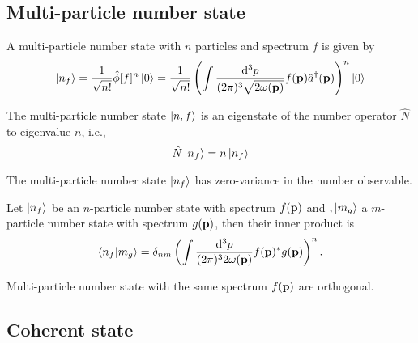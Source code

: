 \subsection{Multi-particle number state}

\begin{definition}
	A multi-particle number state with $n$ particles and spectrum $f$ is given by
	\begin{equation}
		\ket{n_f}
		=
		\frac{1}{\sqrt{n!}}
		\hat\phi[f]^n
		\ket{0}
		=
		\frac{1}{\sqrt{n!}}
		\left(
			\int\frac{\dd[3]{p}}{(2\pi)^3\sqrt{2\omega(\vb{p})}}
			f(\vb{p})
			\hat{a}^\dagger(\vb{p})
		\right)^n
		\ket{0}
	\end{equation}
\end{definition}
\begin{theorem}
	The multi-particle number state $\ket{n,f}$ is an eigenstate of the number operator $\hat{N}$ to eigenvalue $n$, i.e.,
	\begin{equation}
		\hat{N}
		\ket{n_f}
		=
		n
		\ket{n_f}
	\end{equation}
\end{theorem}
\begin{corollary}
	The multi-particle number state $\ket{n_f}$ has zero-variance in the number observable.
\end{corollary}
\begin{theorem}\label{thm:multi_particle_number_state_inner_product}
	Let $\ket{n_f}$ be an $n$-particle number state with spectrum $f(\vb{p})$ and $,\ket{m_g}$ a $m$-particle number state with spectrum $g(\vb{p})$, then their inner product is
	\begin{equation}
		\braket{n_f}{m_g}
		=
		\delta_{nm}
		\left(
			\int\frac{\dd[3]{p}}{(2\pi)^32\omega(\vb{p})}
			f(\vb{p})^*
			g(\vb{p})
		\right)^n
		.
	\end{equation}
\end{theorem}
\begin{corollary}
	Multi-particle number state with the same spectrum $f(\vb{p})$ are orthogonal.
\end{corollary}

\subsection{Coherent state}

